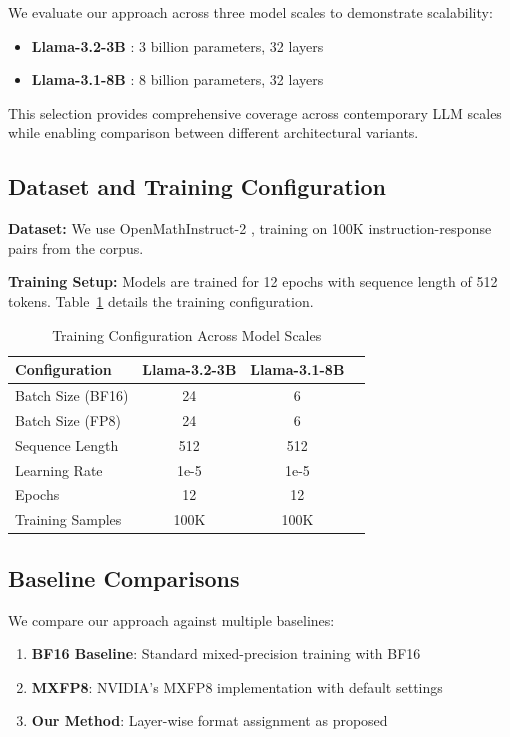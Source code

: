 \documentclass[conference]{IEEEtran}
\begin{document}
We evaluate our approach across three model scales to demonstrate scalability:

\begin{itemize}
\item \textbf{Llama-3.2-3B} \cite{meta2024llama3.2}: 3 billion parameters, 32 layers
\item \textbf{Llama-3.1-8B} \cite{meta2024llama3.1}: 8 billion parameters, 32 layers  
\end{itemize}

This selection provides comprehensive coverage across contemporary LLM scales while enabling comparison between different architectural variants.

\subsection{Dataset and Training Configuration}

\textbf{Dataset:} We use OpenMathInstruct-2 \cite{toshniwal2024openmath2}, training on 100K instruction-response pairs from the corpus.

\textbf{Training Setup:} Models are trained for 12 epochs with sequence length of 512 tokens. Table~\ref{tab:training_config} details the training configuration.

\begin{table}[htbp]
\centering
\caption{Training Configuration Across Model Scales}
\begin{tabular}{@{}lccc@{}}
\toprule
\textbf{Configuration} & \textbf{Llama-3.2-3B} & \textbf{Llama-3.1-8B} \\
\midrule
Batch Size (BF16) & 24 & 6  \\
Batch Size (FP8) & 24 & 6  \\
Sequence Length & 512 & 512 \\
Learning Rate & 1e-5 & 1e-5 \\
Epochs & 12 & 12 \\
Training Samples & 100K & 100K \\
\bottomrule
\end{tabular}
\label{tab:training_config}
\end{table}

\subsection{Baseline Comparisons}

We compare our approach against multiple baselines:

\begin{enumerate}
\item \textbf{BF16 Baseline}: Standard mixed-precision training with BF16
\item \textbf{MXFP8}: NVIDIA's MXFP8 implementation with default settings
\item \textbf{Our Method}: Layer-wise format assignment as proposed
\end{enumerate}
\end{document}
